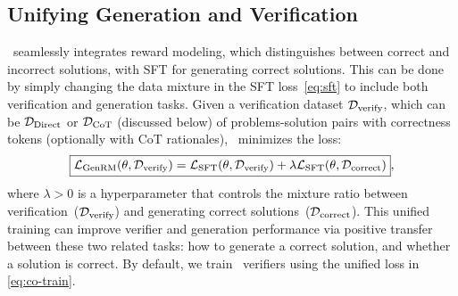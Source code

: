 \subsection{Unifying Generation and Verification} 
\genV\ seamlessly integrates reward modeling, which distinguishes between correct and incorrect solutions, with SFT for generating correct solutions. This can be done by simply changing the data mixture in the SFT loss~\eqref{eq:sft} to include both verification and generation tasks. Given a verification dataset ${\mathcal{D}}_{\text{verify}}$, which can be ${\mathcal{D}}_{\text{Direct}}$ or ${\mathcal{D}}_{\text{CoT}}$ (discussed below) of problems-solution pairs with correctness tokens (optionally with CoT rationales), \genV\ minimizes the loss:
\begin{equation}
\boxed{
{\mathcal{L}}_{{\text{GenRM}}}(\theta, {\mathcal{D}}_{\text{verify}}) = {\mathcal{L}}_{\text{SFT}}(\theta, {\mathcal{D}}_{\text{verify}}) + \lambda {\mathcal{L}}_{\text{SFT}}(\theta, {\mathcal{D}}_{\text{correct}})},
\label{eq:co-train}
\end{equation}
where $\lambda > 0$  is a hyperparameter that controls the mixture ratio between verification~(${\mathcal{D}}_{\text{verify}}$) and generating correct solutions~(${\mathcal{D}}_{\text{correct}}$). 
This unified training can improve verifier and generation performance via positive transfer between these two related tasks: how to generate a correct solution, and whether a solution is correct. By default, we train \genV\ verifiers using the unified loss in \eqref{eq:co-train}.


